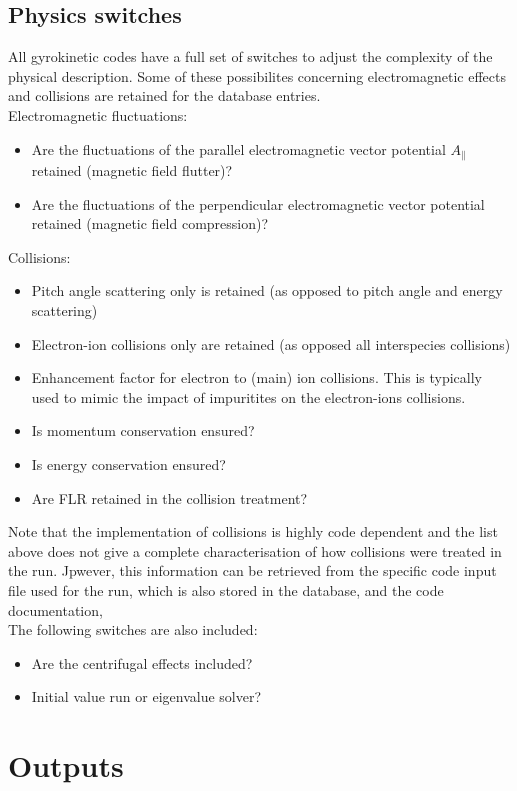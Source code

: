 \documentclass[fleqn]{report}
\begin{document}
\section{Physics switches} \label{sec:switches}
All gyrokinetic codes have a full set of switches to adjust the complexity of the physical description. Some of these possibilites concerning electromagnetic effects and collisions are retained for the database entries.\\ 
Electromagnetic fluctuations:
\begin{itemize}
\item Are the fluctuations of the parallel electromagnetic vector potential $A_\parallel$ retained (magnetic field flutter)?
\item Are the fluctuations of the perpendicular electromagnetic vector potential retained (magnetic field compression)?
\end{itemize}
Collisions:
\begin{itemize}
\item Pitch angle scattering only is retained (as opposed to pitch angle and energy scattering)
\item Electron-ion collisions only are retained (as opposed all interspecies collisions)
\item Enhancement factor for electron to (main) ion collisions. This is typically used to mimic the impact of impuritites on the electron-ions collisions.
\item Is momentum conservation ensured?
\item Is energy conservation ensured?
\item Are FLR retained in the collision treatment?
\end{itemize}
Note that the implementation of collisions is highly code dependent and the list above does not give a complete characterisation of how collisions were treated in the run. Jpwever, this information can be retrieved from the specific code input file used for the run, which is also stored in the database, and the code documentation,\\
The following switches are also included:
\begin{itemize}
\item Are the centrifugal effects included?
\item Initial value run or eigenvalue solver?
\end{itemize}

\chapter{Outputs}
\end{document}
